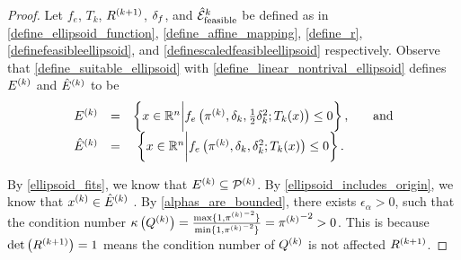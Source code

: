\begin{proof}

Let 
$f_e$,
$T_k$,
${R^{(k+1)}}$, $\delta_{f}$, and ${{\mathcal {\hat E}_{\text{feasible}}}^k}$
be defined as in
\cref{define_ellipsoid_function},
\cref{define_affine_mapping},
\cref{define_r},
\cref{definefeasibleellipsoid}, and
\cref{definescaledfeasibleellipsoid}
respectively. 
Observe that \cref{define_suitable_ellipsoid} with \cref{define_linear_nontrival_ellipsoid} defines  ${E^{(k)}}$ and ${{\hat E}^{(k)}}$ to be
\begin{align*}
\begin{array}{cccc}
{E^{(k)}} &=& \left\{x \in \mathbb R^n \bigg | f_e\left(\pi^{(k)}, \delta_k, \frac 1 2 \delta_k^2; T_k(x)\right) \le 0\right\}, &\quad \textrm{and}  \\
{{\hat E}^{(k)}} &=& \left\{x \in \mathbb R^n \bigg | f_e\left({\pi^{(k)}}, \delta_k, \delta_k^2; T_k(x)\right) \le 0\right\}.&
\end{array}
\end{align*}

By \cref{ellipsoid_fits}, we know that ${E^{(k)}} \subseteq {{\mathcal{P}}^{(k)}}$.
By \cref{ellipsoid_includes_origin}, we know that $x^{(k)} \in {{\hat E}^{(k)}}$ .
By \cref{alphas_are_bounded}, there exists $\epsilon_{\alpha} > 0$, such that the condition number 
${\kappa}\left({Q^{(k)}}\right) = \frac{\max\{1, {\pi^{(k)}}^{-2}\}}{\min\{1, {\pi^{(k)}}^{-2}\}} = {\pi^{(k)}}^{-2} > 0$.
This is because $\det\left({R^{(k+1)}}\right) = 1$ means the condition number of ${Q^{(k)}}$ is not affected ${R^{(k+1)}}$.
\end{proof}





